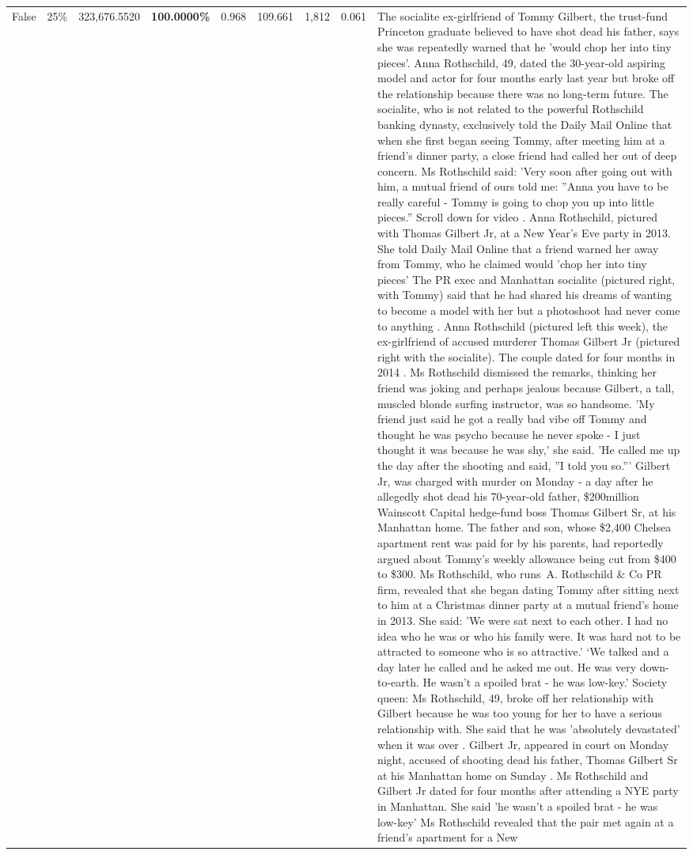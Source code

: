 \begin{table}[H]
\begin{tabular}{lllrlllll}
False & 25\% & 323,676.5520 & \bfseries \color{red} 100.0000\% & 0.968 & 109.661 & 1,812 & 0.061 & The socialite ex-girlfriend of Tommy Gilbert, the trust-fund Princeton graduate believed to have shot dead his father, says she was repeatedly warned that he 'would chop her into tiny pieces'. Anna Rothschild, 49, dated the 30-year-old aspiring model and actor for four months early last year but broke off the relationship because there was no long-term future. The socialite, who is not related to the powerful Rothschild banking dynasty, exclusively told the Daily Mail Online that when she first began seeing Tommy, after meeting him at a friend's dinner party, a close friend had called her out of deep concern. Ms Rothschild said: 'Very soon after going out with him, a mutual friend of ours told me: ''Anna you have to be really careful - Tommy is going to chop you up into little pieces.'' Scroll down for video . Anna Rothschild, pictured with Thomas Gilbert Jr, at a New Year's Eve party in 2013. She told Daily Mail Online that a friend warned her away from Tommy, who he claimed would 'chop her into tiny pieces' The PR exec and Manhattan socialite (pictured right, with Tommy) said that he had shared his dreams of wanting to become a model with her but a photoshoot had never come to anything . Anna Rothschild (pictured left this week), the ex-girlfriend of accused murderer Thomas Gilbert Jr (pictured right with the socialite). The couple dated for four months in 2014 . Ms Rothschild dismissed the remarks, thinking her friend was joking and perhaps jealous because Gilbert, a tall, muscled blonde surfing instructor, was so handsome. 'My friend just said he got a really bad vibe off Tommy and thought he was psycho because he never spoke - I just thought it was because he was shy,' she said. 'He called me up the day after the shooting and said, ''I told you so.''' Gilbert Jr, was charged with murder on Monday - a day after he allegedly shot dead his 70-year-old father, \$200million Wainscott Capital hedge-fund boss Thomas Gilbert Sr, at his Manhattan home. The father and son, whose \$2,400 Chelsea apartment rent was paid for by his parents, had reportedly argued about Tommy's weekly allowance being cut from \$400 to \$300. Ms Rothschild, who runs A. Rothschild \& Co PR firm, revealed that she began dating Tommy after sitting next to him at a Christmas dinner party at a mutual friend's home in 2013. She said: 'We were sat next to each other. I had no idea who he was or who his family were. It was hard not to be attracted to someone who is so attractive.' ‘We talked and a day later he called and he asked me out. He was very down-to-earth. He wasn’t a spoiled brat - he was low-key.’ Society queen: Ms Rothschild, 49, broke off her relationship with Gilbert because he was too young for her to have a serious relationship with. She said that he was 'absolutely devastated' when it was over . Gilbert Jr, appeared in court on Monday night, accused of shooting dead his father, Thomas Gilbert Sr at his Manhattan home on Sunday . Ms Rothschild and Gilbert Jr dated for four months after attending a NYE party in Manhattan. She said 'he wasn't a spoiled brat - he was low-key' Ms Rothschild revealed that the pair met again at a friend’s apartment for a New 
\end{tabular}
\end{table}

